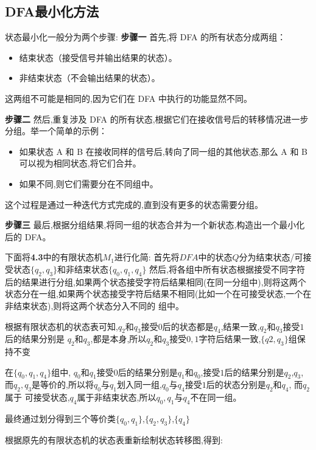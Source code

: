 \documentclass{article}
\begin{document}
\subsection{DFA最小化方法}
    状态最小化一般分为两个步骤:
    \textbf{步骤一}
    首先,将 DFA 的所有状态分成两组：
    \begin{itemize}
        \item 结束状态（接受信号并输出结果的状态）。
        \item 非结束状态（不会输出结果的状态）。 
    \end{itemize}
    这两组不可能是相同的,因为它们在 DFA 中执行的功能显然不同。   

    \textbf{步骤二}
    然后,重复涉及 DFA 的所有状态,根据它们在接收信号后的转移情况进一步分组。举一个简单的示例：
    \begin{itemize}
        \item 如果状态 A 和 B 在接收同样的信号后,转向了同一组的其他状态,那么 A 和 B 可以视为相同状态,将它们合并。
        \item 如果不同,则它们需要分在不同组中。
    \end{itemize}
    这个过程是通过一种迭代方式完成的,直到没有更多的状态需要分组。

    \textbf{步骤三}
    最后,根据分组结果,将同一组的状态合并为一个新状态,构造出一个最小化后的 DFA。
    

下面将\textbf{4.3}中的有限状态机$M_1$进行化简:
首先将$DFA$中的状态$Q$分为结束状态/可接受状态$\{q_2,q_3\}$和非结束状态$\{q_0,q_1,q_4\}$
然后,将各组中所有状态根据接受不同字符后的结果进行分组,如果两个状态接受字符后结果相同(在同一分组中),则将这两个
状态分在一组,如果两个状态接受字符后结果不相同(比如一个在可接受状态,一个在非结束状态),则将这两个状态分入不同的
组中。

根据有限状态机的状态表可知,$q_2$和$q_3$接受$0$后的状态都是$q_4$,结果一致,$q_2$和$q_3$接受$1$后的结果分别是
$q_2$和$q_3$,都是本身,所以$q_2$和$q_3$接受$0,1$字符后结果一致,$\{q2,q_3\}$组保持不变

在$\{q_0,q_1,q_4\}$组中, $q_0$和$q_1$接受$0$后的结果分别是$q_1$和$q_0$,接受$1$后的结果分别是$q_2$,$q_3$,
而$q_2,q_3$是等价的,所以将$q_0$与$q_1$划入同一组,$q_0$与$q_4$接受$1$后的状态分别是$q_2$和$q_4$, 而$q_2$属于
可接受状态,$q_4$属于非结束状态,所以$q_0,q_1$与$q_4$不在同一组。

最终通过划分得到三个等价类$\{q_0,q_1\}$,$\{q_2,q_3\}$,$\{q_4\}$

根据原先的有限状态机的状态表重新绘制状态转移图,得到:
\end{document}
